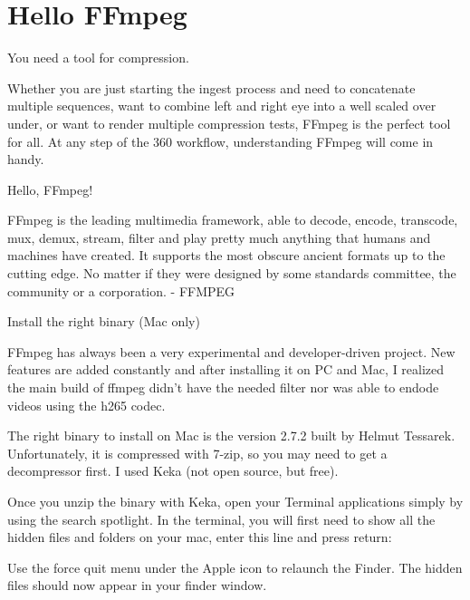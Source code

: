 \chapter{Hello FFmpeg}
\pagecolor{white}
\label{chap:56}
\begin{fullwidth}

\problem

{\large You need a tool for compression. \par}

Whether you are just starting the ingest process and need to concatenate multiple sequences, want to combine left and right eye into a well scaled over under, or want to render multiple compression tests, FFmpeg is the perfect tool for all. At any step of the 360 workflow, understanding FFmpeg will come in handy.

\solutions

{\large Hello, FFmpeg! \par}

FFmpeg is the leading multimedia framework, able to decode, encode, transcode, mux, demux, stream, filter and play pretty much anything that humans and machines have created. It supports the most obscure ancient formats up to the cutting edge. No matter if they were designed by some standards committee, the community or a corporation. - FFMPEG

{\large Install the right binary (Mac only) \par}

FFmpeg has always been a very experimental and developer-driven project. New features are added constantly and after installing it on PC and Mac, I realized the main build of ffmpeg didn’t have the needed filter nor was able to endode videos using the h265 codec. 

The right binary to install on Mac is the version 2.7.2 built by Helmut Tessarek. Unfortunately, it is compressed with 7-zip, so you may need to get a decompressor first. I used Keka (not open source, but free).

Once you unzip the binary with Keka, open your Terminal applications simply by using the search spotlight. In the terminal, you will first need to show all the hidden files and folders on your mac, enter this line and press return:


Use the force quit menu under the Apple icon to relaunch the Finder. The hidden files should now appear in your finder window. 


\end{fullwidth}
